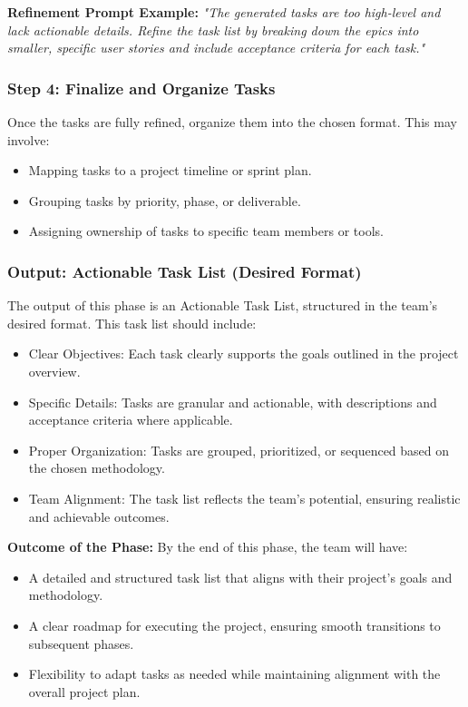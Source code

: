 \documentclass[14pt, a4paper]{article}
\begin{document}
\textbf{Refinement Prompt Example:} \textit{"The generated tasks are too
high-level and lack actionable details. Refine the task list by breaking down
the epics into smaller, specific user stories and include acceptance criteria
for each task."}

\subsubsection*{Step 4: Finalize and Organize Tasks}

Once the tasks are fully refined, organize them into the chosen format. This may
involve:

\begin{itemize}
    \item Mapping tasks to a project timeline or sprint plan.
    \item Grouping tasks by priority, phase, or deliverable.
    \item Assigning ownership of tasks to specific team members or tools.
\end{itemize}

\subsubsection{Output: Actionable Task List (Desired Format)}

The output of this phase is an Actionable Task List, structured in the team’s
desired format. This task list should include:

\begin{itemize}
    \item Clear Objectives: Each task clearly supports the goals outlined in the
    project overview.
    \item Specific Details: Tasks are granular and actionable, with descriptions
    and acceptance criteria where applicable.
    \item Proper Organization: Tasks are grouped, prioritized, or sequenced
    based on the chosen methodology.
    \item Team Alignment: The task list reflects the team’s potential, ensuring
    realistic and achievable outcomes.
\end{itemize}

\textbf{Outcome of the Phase:} By the end of this phase, the team will have:

\begin{itemize}
    \item A detailed and structured task list that aligns with their project’s
    goals and methodology.
    \item A clear roadmap for executing the project, ensuring smooth transitions
    to subsequent phases.
    \item Flexibility to adapt tasks as needed while maintaining alignment with
    the overall project plan.
\end{itemize}
\end{document}
